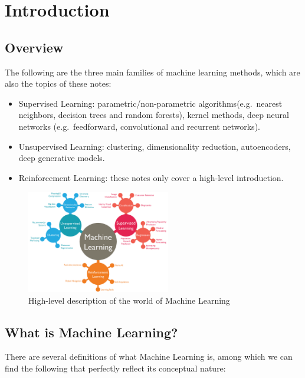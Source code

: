 \section{Introduction}

\subsection{Overview}
The following are the three main families of machine learning methods,
which are also the topics of these notes:

\begin{itemize}
    \item Supervised Learning: parametric/non-parametric
          algorithms(e.g.\ nearest neighbors, decision trees and
          random forests), kernel methods, deep neural networks
          (e.g.\ feedforward, convolutional and recurrent networks).
    \item Unsupervised Learning: clustering, dimensionality reduction,
          autoencoders, deep generative models.
    \item Reinforcement Learning: these notes only cover a high-level
          introduction.
\end{itemize}

\vspace{20mm}

\begin{figure}[h]
    \centering
    \includegraphics[width=0.56\textwidth]{../img/World_of_ML}
    \caption{High-level description of the world of Machine Learning}
\end{figure}

\subsection{What is Machine Learning?}
There are several definitions of what Machine Learning is, among which
we can find the following that perfectly reflect its conceptual nature:


